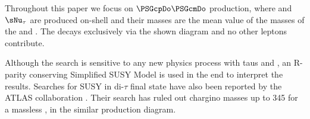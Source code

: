 Throughout this paper we focus on $\PSGcpDo\PSGcmDo$ production, where \sTau and $\sNu_{\tau}$ 
are produced  on-shell and their masses are the mean value of the masses of the \chione and \PSGczDo.
The \chione decays exclusively via the shown diagram and no other leptons contribute.

Although the search is sensitive to any 
new physics process with taus and \MET, an R-parity conserving Simplified SUSY Model \cite{Alwall:2008ag,alves:sms} is used 
in the end to interpret the results.
Searches for SUSY in di-$\tau$ final state have also been reported by the ATLAS collaboration \cite{Aad:2014yka}. Their search has ruled out 
chargino masses up to 345 \GeV for a massless \PSGczDo, in the similar production diagram.


